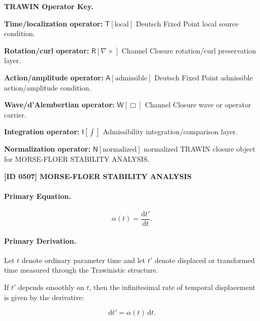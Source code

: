 \par\vspace{0.45\baselineskip}
\noindent\begin{minipage}[t]{\linewidth}
\begingroup
\small
\raggedright
\textbf{TRAWIN Operator Key.}\par
\noindent\textbf{Time/localization operator:} $\mathsf{T}\!\left[\mathrm{local}\right]$ Deutsch Fixed Point local source condition.\par
\noindent\textbf{Rotation/curl operator:} $\mathsf{R}\!\left[\nabla\times\right]$ Channel Closure rotation/curl preservation layer.\par
\noindent\textbf{Action/amplitude operator:} $\mathsf{A}\!\left[\mathrm{admissible}\right]$ Deutsch Fixed Point admissible action/amplitude condition.\par
\noindent\textbf{Wave/d'Alembertian operator:} $\mathsf{W}\!\left[\Box\right]$ Channel Closure wave or operator carrier.\par
\noindent\textbf{Integration operator:} $\mathsf{I}\!\left[\int\right]$ Admissibility integration/comparison layer.\par
\noindent\textbf{Normalization operator:} $\mathsf{N}\!\left[\mathrm{normalized}\right]$ normalized TRAWIN closure object for MORSE-FLOER STABILITY ANALYSIS.\par
\endgroup
\end{minipage}

\clearpage
\noindent\textbf{[ID 0507] MORSE-FLOER STABILITY ANALYSIS}\par
\vspace{0.35em}
\paragraph{Primary Equation.}
\begin{equation}
\alpha(t)=\frac{\mathrm{d}t'}{\mathrm{d}t}.
\end{equation}

\paragraph{Primary Derivation.}
Let $t$ denote ordinary parameter time and let $t'$ denote displaced or transformed time measured through the Trawinistic structure.

If $t'$ depends smoothly on $t$, then the infinitesimal rate of temporal displacement is given by the derivative:

\begin{equation}
\mathrm{d}t' = \alpha(t)\,\mathrm{d}t .
\end{equation}

